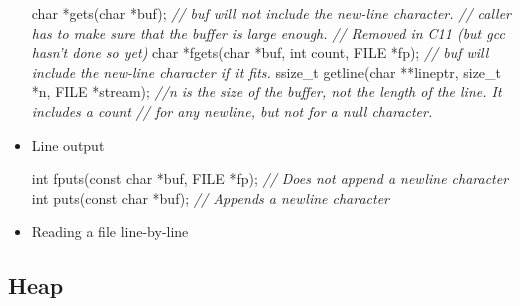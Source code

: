 \documentclass[]{article}
\newenvironment{Shaded}{}{}
\newcommand{\DataTypeTok}[1]{\textcolor[rgb]{0.56,0.13,0.00}{#1}}
\newcommand{\DecValTok}[1]{\textcolor[rgb]{0.25,0.63,0.44}{#1}}
\newcommand{\StringTok}[1]{\textcolor[rgb]{0.25,0.44,0.63}{#1}}
\newcommand{\CommentTok}[1]{\textcolor[rgb]{0.38,0.63,0.69}{\textit{#1}}}
\newcommand{\ControlFlowTok}[1]{\textcolor[rgb]{0.00,0.44,0.13}{\textbf{#1}}}
\newcommand{\NormalTok}[1]{#1}
\begin{document}
\begin{itemize}
\begin{Shaded}
\begin{Highlighting}[]
\DataTypeTok{char}\NormalTok{ *gets(}\DataTypeTok{char}\NormalTok{ *buf);}
\CommentTok{// buf will not include the new-line character.}
\CommentTok{// caller has to make sure that the buffer is large enough.}
\CommentTok{// Removed in C11 (but gcc hasn't done so yet)}
\DataTypeTok{char}\NormalTok{ *fgets(}\DataTypeTok{char}\NormalTok{ *buf, }\DataTypeTok{int}\NormalTok{ count, FILE *fp);}
\CommentTok{// buf will include the new-line character if it fits.}
\DataTypeTok{ssize_t}\NormalTok{ getline(}\DataTypeTok{char}\NormalTok{ **lineptr, }\DataTypeTok{size_t}\NormalTok{ *n, FILE *stream);}
\CommentTok{//n is the size of the buffer, not the length of the line. It includes a count}
\CommentTok{// for any newline, but not for a null character.}
\end{Highlighting}
\end{Shaded}
\item
  Line output

\begin{Shaded}
\begin{Highlighting}[]
\DataTypeTok{int}\NormalTok{ fputs(}\DataTypeTok{const} \DataTypeTok{char}\NormalTok{ *buf, FILE *fp);	}\CommentTok{// Does not append a newline character}
\DataTypeTok{int}\NormalTok{ puts(}\DataTypeTok{const} \DataTypeTok{char}\NormalTok{ *buf); 				}\CommentTok{// Appends a newline character}
\end{Highlighting}
\end{Shaded}
\item
  Reading a file line-by-line

\begin{Shaded}
\end{Shaded}
\end{itemize}

\subsection{\texorpdfstring{\textbf{Heap}}{Heap}}\label{header-n32}
\end{document}
